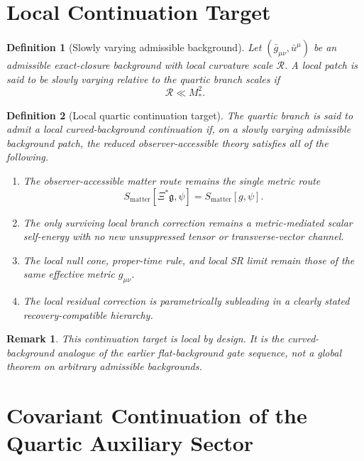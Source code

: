 \documentclass[11pt]{article}
\newcommand{\BridgeMetric}{\mathfrak{g}}
\newtheorem{definition}{Definition}
\newtheorem{remark}{Remark}
\begin{document}
\section{Local Continuation Target}

\begin{definition}[Slowly varying admissible background]
Let \((\bar g_{\mu\nu},\bar u^\mu)\) be an admissible exact-closure background with local curvature scale \(\mathcal R\). A local patch is said to be slowly varying relative to the quartic branch scales if
\begin{equation}
\mathcal R \ll M_*^2.
\label{eq:curvaturehierarchy}
\end{equation}
\end{definition}

\begin{definition}[Local quartic continuation target]
The quartic branch is said to admit a local curved-background continuation if, on a slowly varying admissible background patch, the reduced observer-accessible theory satisfies all of the following.
\begin{enumerate}
    \item The observer-accessible matter route remains the single metric route
    \begin{equation}
    S_{\mathrm{matter}}[\Xi^*\BridgeMetric,\psi]
    =
    S_{\mathrm{matter}}[g,\psi].
    \label{eq:matterroute}
    \end{equation}
    \item The only surviving local branch correction remains a metric-mediated scalar self-energy with no new unsuppressed tensor or transverse-vector channel.
    \item The local null cone, proper-time rule, and local SR limit remain those of the same effective metric \(g_{\mu\nu}\).
    \item The local residual correction is parametrically subleading in a clearly stated recovery-compatible hierarchy.
\end{enumerate}
\end{definition}

\begin{remark}
This continuation target is local by design. It is the curved-background analogue of the earlier flat-background gate sequence, not a global theorem on arbitrary admissible backgrounds.
\end{remark}

\section{Covariant Continuation of the Quartic Auxiliary Sector}
\end{document}
